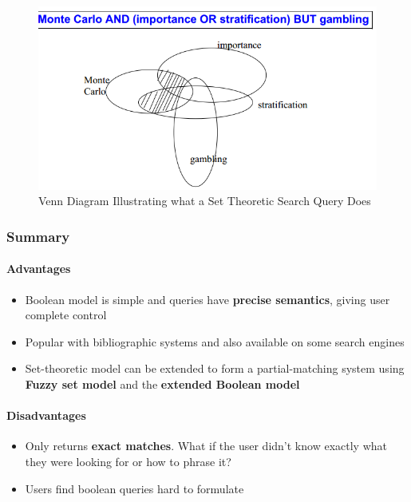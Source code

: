 \documentclass{article}
\begin{document}
\begin{figure}[H]
	\centering
	\includegraphics[scale=0.4]{figures/ir-set-theoric-venn2.png}
	\caption{Venn Diagram Illustrating what a Set Theoretic Search Query Does}
	\label{fig:ir-set-theoric-venn2}
\end{figure}

\subsubsection{Summary}

\paragraph{\textbf{Advantages}}
\begin{itemize}
	\item Boolean model is simple and queries have \textbf{precise semantics}, giving user complete control
	\item Popular with bibliographic systems and also available on some search engines
	\item Set-theoretic model can be extended to form a partial-matching system using \textbf{Fuzzy set model} and the \textbf{extended Boolean model}
\end{itemize}
\paragraph{\textbf{Disadvantages}}
\begin{itemize}
	\item Only returns \textbf{exact matches}. What if the user didn't know exactly what they were looking for or how to phrase it?
	\item Users find boolean queries hard to formulate
\end{itemize}
\end{document}
